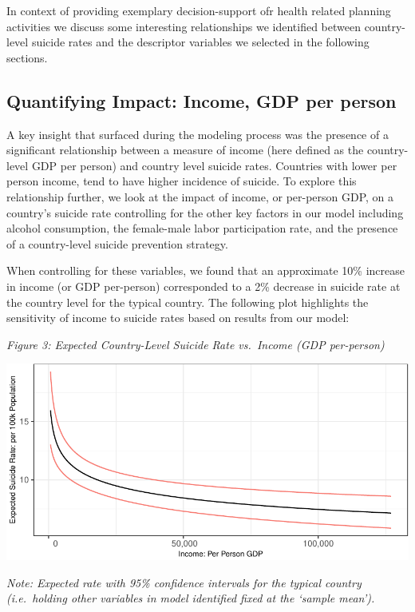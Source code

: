 \documentclass[]{article}
\begin{document}
In context of providing exemplary decision-support ofr health related
planning activities we discuss some interesting relationships we
identified between country-level suicide rates and the descriptor
variables we selected in the following sections.

\subsection{Quantifying Impact: Income, GDP per
person}\label{quantifying-impact-income-gdp-per-person}

A key insight that surfaced during the modeling process was the presence
of a significant relationship between a measure of income (here defined
as the country-level GDP per person) and country level suicide rates.
Countries with lower per person income, tend to have higher incidence of
suicide. To explore this relationship further, we look at the impact of
income, or per-person GDP, on a country's suicide rate controlling for
the other key factors in our model including alcohol consumption, the
female-male labor participation rate, and the presence of a
country-level suicide prevention strategy.

When controlling for these variables, we found that an approximate 10\%
increase in income (or GDP per-person) corresponded to a 2\% decrease in
suicide rate at the country level for the typical country. The following
plot highlights the sensitivity of income to suicide rates based on
results from our model:

\emph{Figure 3: Expected Country-Level Suicide Rate vs.~Income (GDP
per-person)}

\begin{center}\includegraphics{Project_Report_files/figure-latex/agdp_plot-1} \end{center}

\emph{Note: Expected rate with 95\% confidence intervals for the typical
country (i.e.~holding other variables in model identified fixed at the
`sample mean').}
\end{document}
